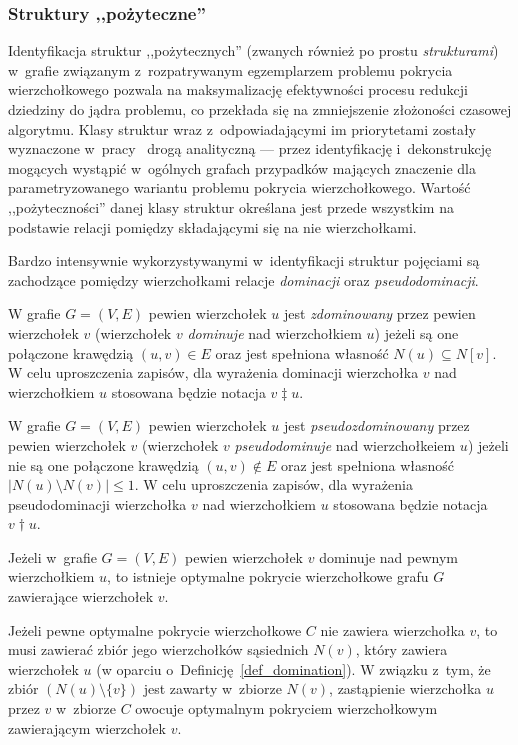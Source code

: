 \subsubsection{\textbf{Struktury ,,pożyteczne''}}
\label{sss_ckx_structures}
\par{
  Identyfikacja struktur ,,pożytecznych'' (zwanych również po prostu \emph{strukturami}) w~grafie związanym z~rozpatrywanym egzemplarzem problemu pokrycia wierzchołkowego pozwala na maksymalizację efektywności procesu redukcji dziedziny do jądra problemu, co przekłada się na zmniejszenie złożoności czasowej algorytmu. Klasy struktur wraz z~odpowiadającymi im priorytetami zostały wyznaczone w~pracy~\cite{ImprovedBounds10} drogą analityczną --- przez identyfikację i~dekonstrukcję mogących wystąpić w~ogólnych grafach przypadków mających znaczenie dla parametryzowanego wariantu problemu pokrycia wierzchołkowego.
  Wartość ,,pożyteczności'' danej klasy struktur określana jest przede wszystkim na podstawie relacji pomiędzy składającymi się na nie wierzchołkami.
}
\par{
  Bardzo intensywnie wykorzystywanymi w~identyfikacji struktur pojęciami są zachodzące pomiędzy wierzchołkami relacje \emph{dominacji} oraz \emph{pseudodominacji}.
  \begin{definition}
    W grafie $G=(V, E)$ pewien wierzchołek $u$ jest \emph{zdominowany} przez pewien wierzchołek $v$ (wierzchołek $v$ \emph{dominuje} nad wierzchołkiem $u$) jeżeli są one połączone krawędzią $(u, v) \in E$ oraz jest spełniona własność $N(u) \subseteq N[v]$.
    W celu uproszczenia zapisów, dla wyrażenia dominacji wierzchołka $v$ nad wierzchołkiem $u$ stosowana będzie notacja $v \ddagger u$.
  \end{definition}
  \begin{definition}
    W grafie $G=(V, E)$ pewien wierzchołek $u$ jest \emph{pseudozdominowany} przez pewien wierzchołek $v$ (wierzchołek $v$ \emph{pseudodominuje} nad wierzchołkeiem $u$) jeżeli nie są one połączone krawędzią $(u, v) \notin E$ oraz jest spełniona własność $|N(u) \setminus N(v)| \leq 1$.
    W celu uproszczenia zapisów, dla wyrażenia pseudodominacji wierzchołka $v$ nad wierzchołkiem $u$ stosowana będzie notacja $v \dagger u$.
  \end{definition}
  \begin{theorem}
      Jeżeli w~grafie $G=(V, E)$ pewien wierzchołek $v$ dominuje nad pewnym wierzchołkiem $u$, to istnieje optymalne pokrycie wierzchołkowe grafu $G$ zawierające wierzchołek $v$.
  \end{theorem}
  \begin{bproof}
    Jeżeli pewne optymalne pokrycie wierzchołkowe $C$ nie zawiera wierzchołka $v$, to musi zawierać zbiór jego wierzchołków sąsiednich $N(v)$, który zawiera wierzchołek $u$ (w oparciu o~Definicję~\ref{def_domination}).
    W związku z~tym, że zbiór $(N(u) \setminus \{v\})$ jest zawarty w~zbiorze $N(v)$, zastąpienie wierzchołka $u$ przez $v$ w~zbiorze $C$ owocuje optymalnym pokryciem wierzchołkowym zawierającym wierzchołek $v$.
  \end{bproof}
}
